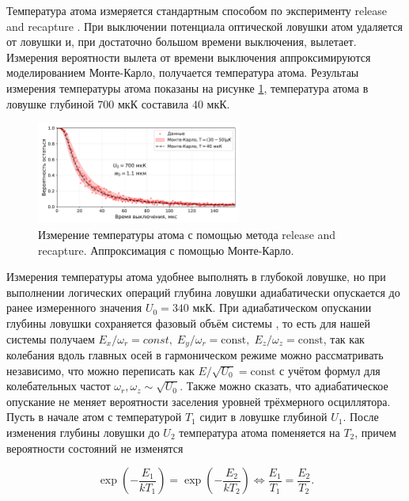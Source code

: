 Температура атома измеряется стандартным способом по эксперименту release and recapture \cite{Tuchendler2008EnergyDA}. При выключении потенциала оптической ловушки атом удаляется от ловушки и, при достаточно большом времени выключения, вылетает. Измерения вероятности вылета от времени выключения аппроксимируются моделированием Монте-Карло, получается температура атома. Результаы измерения температуры атома показаны на рисунке \ref{fig:temperature}, температура атома в ловушке глубиной $700\text{ мкК}$ составила $40\text{ мкК}$.

\begin{figure}[H]
	\centering
	\includegraphics[width=0.6\textwidth]{images/temperature.pdf}
	\caption{Измерение температуры атома с помощью метода release and recapture. Аппроксимация с помощью Монте-Карло.}
	\label{fig:temperature}
\end{figure}

Измерения температуры атома удобнее выполнять в глубокой ловушке, но при выполнении логических операций глубина ловушки адиабатически опускается \cite{Tuchendler2008EnergyDA} до ранее измеренного значения $U_0 = 340\text{ мкК}$. При адиабатическом опускании глубины ловушки сохраняется фазовый объём системы \cite{LL_mechanics}, то есть для нашей системы получаем $E_{x}/\omega_r = const, \; E_{y}/\omega_r = \text{const}, \; E_{z}/\omega_z = \text{const}$, так как колебания вдоль главных осей в гармоническом режиме можно рассматривать независимо, что можно переписать как $E/\sqrt{U_0} = \text{const}$ с учётом формул для колебательных частот $\omega_r, \omega_z \sim \sqrt{U_0}$. Также можно сказать, что адиабатическое опускание не меняет вероятности заселения уровней трёхмерного осциллятора. Пусть в начале атом с температурой $T_{1}$ сидит в ловушке глубиной $U_1$. После изменения глубины ловушки до $U_{2}$ температура атома поменяется на $T_{2}$, причем вероятности состояний не изменятся 

\begin{equation}
	\exp\left(-\frac{E_{1}}{kT_{1}}\right) = \exp\left(-\frac{E_{2}}{kT_{2}}\right) \Leftrightarrow \frac{E_{1}}{T_{1}} = \frac{E_{2}}{T_{2}}.
\end{equation}

